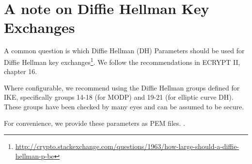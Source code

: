 \section{A note on Diffie Hellman Key Exchanges}
\label{section:DH}

A common question is which Diffie Hellman (DH) Parameters  should be used for Diffie Hellman key exchanges\footnote{\url{http://crypto.stackexchange.com/questions/1963/how-large-should-a-diffie-hellman-p-be}}. We follow the recommendations in ECRYPT II, chapter 16.\cite{ii2011ecrypt}

Where configurable, we recommend using the Diffie Hellman groups
defined for IKE, specifically groups 14-18 (for MODP) and 19-21 (for
elliptic curve DH). These groups have been checked by many eyes and
can be assumed to be secure. 

For convenience, we provide these parameters as PEM files. .
